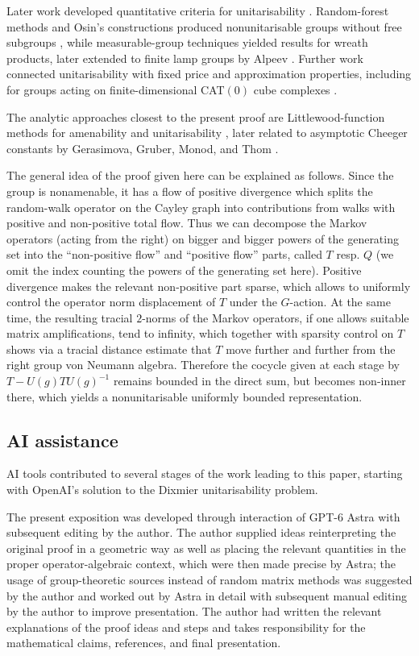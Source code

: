 \documentclass[a4paper,11pt]{amsproc}
\numberwithin{equation}{section}
\theoremstyle{definition}
\begin{document}
Later work developed quantitative criteria for unitarisability \cite{pisier98,pisier05}. Random-forest methods and Osin's constructions produced nonunitarisable groups without free subgroups \cite{em,osin}, while measurable-group techniques yielded results for wreath products, later extended to finite lamp groups by Alpeev \cite{monod,gl,mo,alpeev}. Further work connected unitarisability with fixed price and approximation properties, including for groups acting on finite-dimensional CAT$(0)$ cube complexes \cite{thom-forests,vergara}.

The analytic approaches closest to the present proof are Littlewood-function methods for amenability and unitarisability \cite{wysoczanski,bf,em}, later related to asymptotic Cheeger constants by Gerasimova, Gruber, Monod, and Thom \cite{ggmt}.

The general idea of the proof given here can be explained as follows. Since the group is nonamenable, it has a flow of positive divergence which splits the random-walk operator on the Cayley graph into contributions from walks with positive and non-positive total flow. Thus we can decompose the Markov operators (acting from the right) on bigger and bigger powers of the generating set into the ``non-positive flow'' and ``positive flow'' parts, called $T$ resp. $Q$ (we omit the index counting the powers of the generating set here). Positive divergence makes the relevant non-positive part sparse, which allows to uniformly control the operator norm displacement of $T$ under the $G$-action. At the same time, the resulting tracial $2$-norms of the Markov operators, if one allows suitable matrix amplifications, tend to infinity, which together with sparsity control on $T$ shows via a tracial distance estimate that $T$ move further and further from the right group von Neumann algebra. Therefore the cocycle given at each stage by $T - U(g)TU(g)^{-1}$ remains bounded in the direct sum, but becomes non-inner there, which yields a nonunitarisable uniformly bounded representation.

\subsection*{AI assistance}
AI tools contributed to several stages of the work leading to this paper, starting with OpenAI's solution to the Dixmier unitarisability problem.

The present exposition was developed through interaction of GPT-6 Astra with subsequent editing by the author. The author supplied ideas reinterpreting the original proof in a geometric way as well as placing the relevant quantities in the proper operator-algebraic context, which were then made precise by Astra; the usage of group-theoretic sources  instead of random matrix methods was suggested by the author and worked out by Astra in detail with subsequent manual editing by the author to improve presentation. The author had written the relevant explanations of the proof ideas and steps and takes responsibility for the mathematical claims, references, and final presentation.
\end{document}
